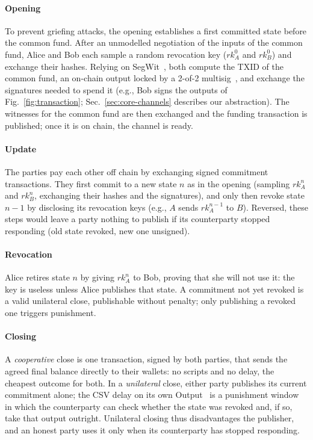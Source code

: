 \paragraph{Opening}\label{par:opening}
To prevent griefing attacks, the opening establishes a first committed state
before the common fund. After an unmodelled negotiation of the inputs of the
common fund, Alice and Bob each sample a random revocation key ($rk^0_A$ and
$rk^0_B$) and exchange their hashes. Relying on SegWit~\cite{bip141}, both
compute the TXID of the common fund, an on-chain output locked by a 2-of-2
multisig~\cite{bip11}, and exchange the signatures needed to spend it (e.g.,
Bob signs the outputs of Fig.~\ref{fig:transaction};
Sec.~\ref{sec:core-channels} describes our abstraction). The witnesses for the
common fund are then exchanged and the funding transaction is published; once
it is on chain, the channel is ready.

\paragraph{Update}\label{par:update}
The parties pay each other off chain by exchanging signed commitment
transactions. They first commit to a new state $n$ as in the opening (sampling
$rk^n_A$ and $rk^n_B$, exchanging their hashes and the signatures), and only
then revoke state $n-1$ by disclosing its revocation keys (e.g., $A$ sends
$rk^{n-1}_A$ to $B$). Reversed, these steps would leave a party nothing to
publish if its counterparty stopped responding (old state revoked, new one
unsigned).

\paragraph{Revocation}\label{par:revocation}
Alice retires state $n$ by giving $rk^n_A$ to Bob, proving that she will not use
it: the key is useless unless Alice publishes that state. A commitment not yet
revoked is a valid unilateral close, publishable without penalty; only
publishing a revoked one triggers punishment.

\paragraph{Closing}\label{par:closing}
A \emph{cooperative} close is one transaction, signed by both parties, that
sends the agreed final balance directly to their wallets: no scripts and no
delay, the cheapest outcome for both. In a \emph{unilateral} close, either
party publishes its current commitment alone; the CSV delay on its own
Output~ is a punishment window in which the counterparty can check
whether the state was revoked and, if so, take that output outright.
Unilateral closing thus disadvantages the publisher, and an honest party uses
it only when its counterparty has stopped responding.

